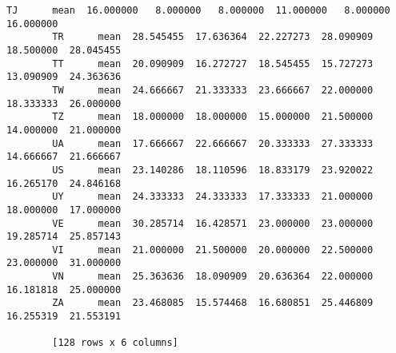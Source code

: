 \documentclass[11pt]{article}
\begin{document}
\begin{Verbatim}[commandchars=\\\{\}]
        TJ      mean  16.000000   8.000000   8.000000  11.000000   8.000000  16.000000
        TR      mean  28.545455  17.636364  22.227273  28.090909  18.500000  28.045455
        TT      mean  20.090909  16.272727  18.545455  15.727273  13.090909  24.363636
        TW      mean  24.666667  21.333333  23.666667  22.000000  18.333333  26.000000
        TZ      mean  18.000000  18.000000  15.000000  21.500000  14.000000  21.000000
        UA      mean  17.666667  22.666667  20.333333  27.333333  14.666667  21.666667
        US      mean  23.140286  18.110596  18.833179  23.920022  16.265170  24.846168
        UY      mean  24.333333  24.333333  17.333333  21.000000  18.000000  17.000000
        VE      mean  30.285714  16.428571  23.000000  23.000000  19.285714  25.857143
        VI      mean  21.000000  21.500000  20.000000  22.500000  23.000000  31.000000
        VN      mean  25.363636  18.090909  20.636364  22.000000  16.181818  25.000000
        ZA      mean  23.468085  15.574468  16.680851  25.446809  16.255319  21.553191
        
        [128 rows x 6 columns]
\end{Verbatim}
        
\end{document}
